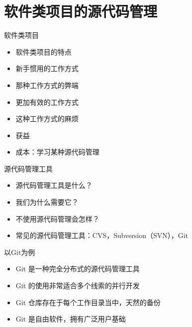\part{软件类项目的源代码管理}

\begin{frame}[<+->]{软件类项目}
  \begin{itemize}
    \item 软件类项目的特点
    \item 新手惯用的工作方式
    \item 那种工作方式的弊端
    \item 更加有效的工作方式
    \item 这种工作方式的麻烦
    \item 获益
    \item 成本：学习某种源代码管理
  \end{itemize}
\end{frame}

\begin{frame}[<+->]{源代码管理工具}
  \begin{itemize}
    \item 源代码管理工具是什么？
    \item 我们为什么需要它？
    \item 不使用源代码管理会怎样？
    \item 常见的源代码管理工具：CVS，Subversion（SVN），Git
  \end{itemize}
\end{frame}


\begin{frame}[<+->]{以Git为例}
  \begin{itemize}
    \item Git 是一种完全分布式的源代码管理工具
    \item Git 的使用非常适合多个线索的并行开发
    \item Git 仓库存在于每个工作目录当中，天然的备份
    \item Git 是自由软件，拥有广泛用户基础 
  \end{itemize}
\end{frame}

